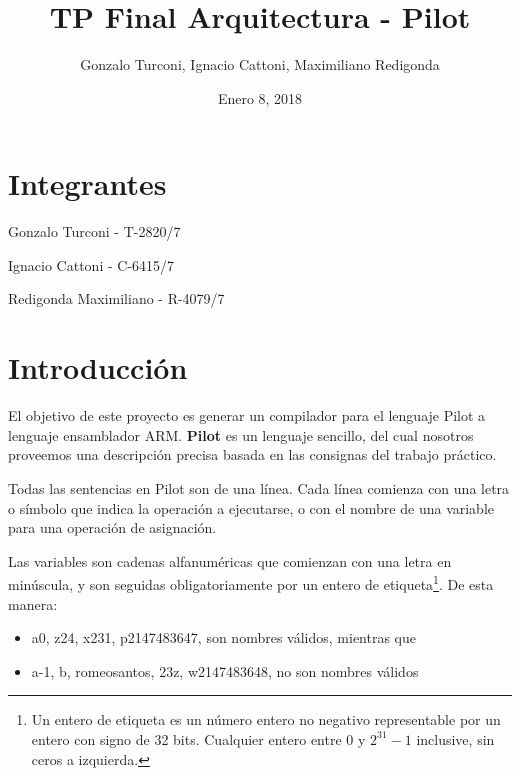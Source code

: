 \documentclass[12pt,spanish]{article}
\begin{document}
 
 
\title{TP Final Arquitectura - Pilot}
\author{Gonzalo Turconi, Ignacio Cattoni, Maximiliano Redigonda}
\date{Enero 8, 2018}
 
\maketitle

\section{Integrantes}

Gonzalo Turconi - T-2820/7

\noindent
Ignacio Cattoni - C-6415/7

\noindent
Redigonda Maximiliano - R-4079/7
\section{Introducción}
El objetivo de este proyecto es generar un compilador para el lenguaje Pilot a lenguaje ensamblador ARM. \textbf{Pilot} es un lenguaje sencillo, del cual nosotros proveemos una descripción precisa basada en las consignas del trabajo práctico.

Todas las sentencias en Pilot son de una línea. Cada línea comienza con una letra o símbolo que indica la operación a ejecutarse, o con el nombre de una variable para una operación de asignación.

Las variables son cadenas alfanuméricas que comienzan con una letra en minúscula, y son seguidas obligatoriamente por un entero de etiqueta\footnote{Un entero de etiqueta es un número entero no negativo representable por un entero con signo de 32 bits. Cualquier entero entre $0$ y $2^{31}-1$ inclusive, sin ceros a izquierda.}. De esta manera:
\begin{itemize}
\item{a0, z24, x231, p2147483647, son nombres válidos, mientras que}
\item{a-1, b, romeosantos, 23z, w2147483648, no son nombres válidos}
\end{itemize}
\end{document}
